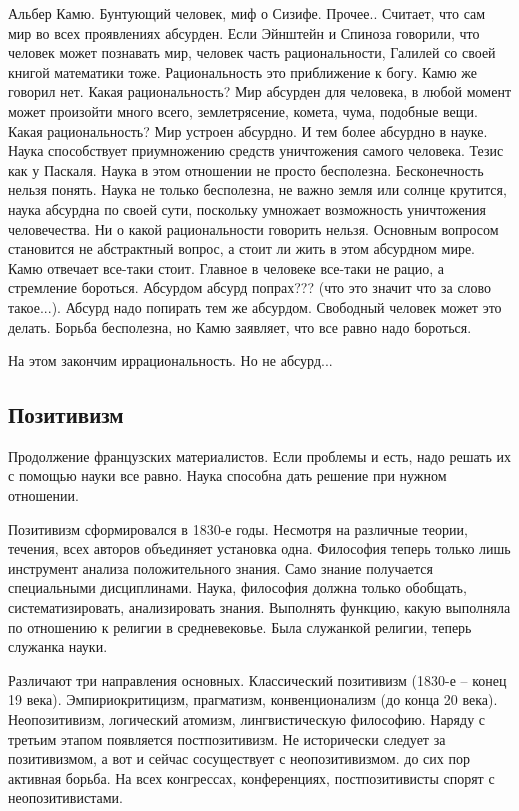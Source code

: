 \documentclass[a4paper, 12pt]{article}
\begin{document}
Альбер Камю. Бунтующий человек, миф о Сизифе. Прочее.. Считает, что сам 
мир во всех проявлениях абсурден. Если Эйнштейн и Спиноза говорили, что 
человек может познавать мир, человек часть рациональности, Галилей со 
своей книгой математики тоже. Рациональность это приближение к богу. 
Камю же говорил нет. Какая рациональность? Мир абсурден для человека, 
в любой момент может произойти много всего, землетрясение, комета, чума, 
подобные вещи. Какая рациональность? Мир устроен абсурдно. И тем более 
абсурдно в науке. Наука способствует приумножению средств уничтожения 
самого человека. Тезис как у Паскаля. Наука в этом отношении не просто 
бесполезна. Бесконечность нельзя понять. Наука не только бесполезна, не 
важно земля или солнце крутится, наука абсурдна по своей сути, поскольку 
умножает возможность уничтожения человечества. Ни о какой рациональности 
говорить нельзя. Основным вопросом становится не абстрактный вопрос, 
а стоит ли жить в этом абсурдном мире. Камю отвечает все-таки стоит. 
Главное в человеке все-таки не рацио, а стремление бороться. Абсурдом 
абсурд попрах??? (что это значит что за слово такое...). Абсурд надо 
попирать тем же абсурдом. Свободный человек может это делать. Борьба 
бесполезна, но Камю заявляет, что все равно надо бороться.

На этом закончим иррациональность. Но не абсурд...

\subsection{Позитивизм}

Продолжение французских материалистов. Если проблемы и есть, надо решать 
их с помощью науки все равно. Наука способна дать решение при нужном 
отношении.

Позитивизм сформировался в 1830-е годы. Несмотря на различные теории, 
течения, всех авторов объединяет установка одна. Философия теперь только 
лишь инструмент анализа положительного знания. Само знание получается 
специальными дисциплинами. Наука, философия должна только обобщать, 
систематизировать, анализировать знания. Выполнять функцию, какую 
выполняла по отношению к религии в средневековье. Была служанкой 
религии, теперь служанка науки.

Различают три направления основных. Классический позитивизм (1830-е -- 
конец 19 века). Эмпириокритицизм, прагматизм, конвенционализм (до конца 
20 века). Неопозитивизм, логический атомизм, лингвистическую философию. 
Наряду с третьим этапом появляется постпозитивизм. Не исторически 
следует за позитивизмом, а вот и сейчас сосуществует с неопозитивизмом. 
до сих пор активная борьба. На всех конгрессах, конференциях, 
постпозитивисты спорят с неопозитивистами.
\end{document}
